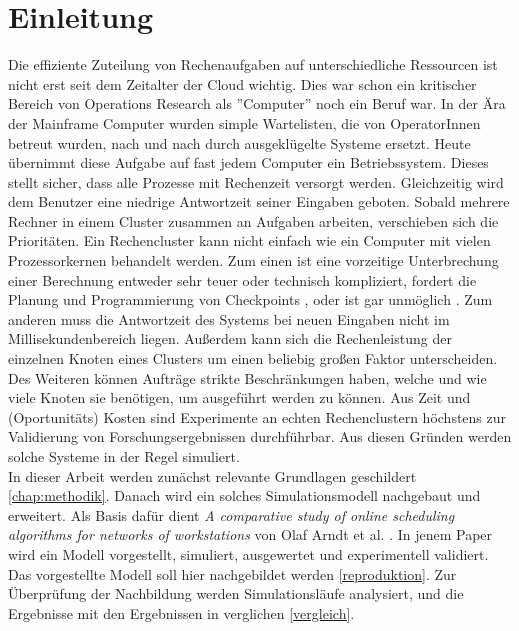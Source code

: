 \chapter{Einleitung}
\label{chap:ein}


Die effiziente Zuteilung von Rechenaufgaben auf unterschiedliche Ressourcen ist nicht erst seit dem Zeitalter der Cloud wichtig. Dies war schon ein kritischer Bereich von Operations Research
als ''Computer'' noch ein Beruf war.
In der Ära der Mainframe Computer wurden simple Wartelisten, die von OperatorInnen betreut wurden, nach und nach durch ausgeklügelte Systeme ersetzt. %
Heute übernimmt diese Aufgabe auf fast jedem Computer ein Betriebssystem. Dieses stellt sicher, dass alle Prozesse mit Rechenzeit versorgt werden. Gleichzeitig wird dem Benutzer eine niedrige Antwortzeit seiner Eingaben geboten. Sobald mehrere Rechner in einem Cluster zusammen an Aufgaben arbeiten, verschieben sich die Prioritäten. Ein Rechencluster kann nicht einfach wie ein Computer mit vielen Prozessorkernen behandelt werden. Zum einen ist eine vorzeitige Unterbrechung einer Berechnung entweder sehr teuer oder technisch kompliziert, fordert die Planung und Programmierung von Checkpoints \cite{IPS15}, oder ist gar unmöglich \cite{adams1979hitchhiker}.
Zum anderen muss die Antwortzeit des Systems bei neuen Eingaben nicht im Millisekundenbereich liegen.
Außerdem kann sich die Rechenleistung der einzelnen Knoten eines Clusters um einen beliebig großen Faktor unterscheiden.
Des Weiteren können Aufträge strikte Beschränkungen haben, welche und  wie viele Knoten sie benötigen, um ausgeführt werden zu können. Aus Zeit und (Oportunitäts) Kosten sind Experimente an echten Rechenclustern höchstens zur Validierung von Forschungsergebnissen durchführbar. Aus diesen Gründen werden solche Systeme in der Regel simuliert.\\
In dieser Arbeit werden zunächst relevante Grundlagen geschildert \ref{chap:methodik}.
Danach wird ein solches Simulationsmodell nachgebaut und erweitert. Als Basis dafür dient \emph{A comparative study of online scheduling algorithms for networks of workstations} von Olaf Arndt et al. \cite{Arn99}. In jenem Paper wird ein Modell vorgestellt, simuliert, ausgewertet und experimentell validiert. Das vorgestellte Modell soll hier nachgebildet werden \ref{reproduktion}. Zur Überprüfung der Nachbildung werden Simulationsläufe analysiert, und die Ergebnisse mit den Ergebnissen in \cite{Arn99} verglichen \ref{vergleich}.\\
